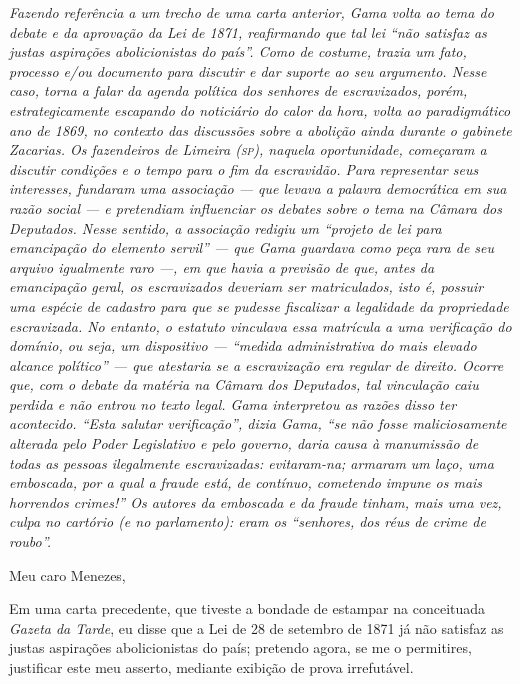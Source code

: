 \begin{resumo}
\emph{Fazendo referência a um trecho de uma carta anterior, Gama volta
ao tema do debate e da aprovação da Lei de 1871, reafirmando que tal lei
``não satisfaz as justas aspirações abolicionistas do país''. Como de
costume, trazia um fato, processo e/ou documento para discutir e dar
suporte ao seu argumento. Nesse caso, torna a falar da agenda política
dos senhores de escravizados, porém, estrategicamente escapando do
noticiário do calor da hora, volta ao paradigmático ano de 1869, no
contexto das discussões sobre a abolição ainda durante o gabinete
Zacarias. Os fazendeiros de Limeira (\textsc{sp}), naquela oportunidade,
começaram a discutir condições e o tempo para o fim da escravidão. Para
representar seus interesses, fundaram uma associação --- que levava a
palavra democrática em sua razão social --- e pretendiam influenciar os
debates sobre o tema na Câmara dos Deputados. Nesse sentido, a
associação redigiu um ``projeto de lei para emancipação do elemento
servil'' --- que Gama guardava como peça rara de seu arquivo igualmente
raro ---, em que havia a previsão de que, antes da emancipação geral, os
escravizados deveriam ser matriculados, isto é, possuir uma espécie de
cadastro para que se pudesse fiscalizar a legalidade da propriedade
escravizada. No entanto, o estatuto vinculava essa matrícula a uma
verificação do domínio, ou seja, um dispositivo --- ``medida
administrativa do mais elevado alcance político'' --- que atestaria se a
escravização era regular de direito. Ocorre que, com o debate da matéria
na Câmara dos Deputados, tal vinculação caiu perdida e não entrou no
texto legal. Gama interpretou as razões disso ter acontecido. ``Esta
salutar verificação'', dizia Gama, ``se não fosse maliciosamente alterada
pelo Poder Legislativo e pelo governo, daria causa à manumissão de todas
as pessoas ilegalmente escravizadas: evitaram-na; armaram um laço, uma
emboscada, por a qual a fraude está, de contínuo, cometendo impune os
mais horrendos crimes!'' Os autores da emboscada e da fraude tinham, mais
uma vez, culpa no cartório (e no parlamento): eram os ``senhores, dos
réus de crime de roubo''.}
\end{resumo}\pagebreak

Meu caro Menezes,

Em uma carta precedente, que tiveste a bondade de estampar na
conceituada \emph{Gazeta da Tarde}, eu disse que a Lei de 28 de setembro
de 1871 já não satisfaz as justas aspirações abolicionistas do país;
pretendo agora, se me o permitires, justificar este meu asserto,
mediante exibição de prova irrefutável.

